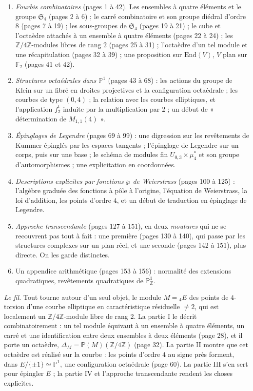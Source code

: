 \documentclass[11pt,a4paper]{article}
\begin{document}
\begin{enumerate}
\item[I.] \emph{Fourbis combinatoires} (pages 1 à 42). Les ensembles à quatre
éléments et le groupe $\mathfrak{S}_4$ (pages 2 à 6) ; le carré combinatoire et
son groupe diédral d'ordre $8$ (pages 7 à 19) ; les sous-groupes de
$\mathfrak{S}_4$ (pages 19 à 21) ; le cube et l'octaèdre attachés à un ensemble
à quatre éléments (pages 22 à 24) ; les $\mathbb{Z}/4\mathbb{Z}$-modules libres
de rang $2$ (pages 25 à 31) ; l'octaèdre d'un tel module et une récapitulation
(pages 32 à 39) ; une proposition sur $\mathrm{End}(V)$, $V$ plan sur
$\mathbb{F}_2$ (pages 41 et 42).
\item[II.] \emph{Structures octaédrales dans $\mathbb{P}^1$} (pages 43 à 68) :
les actions du groupe de Klein sur un fibré en droites projectives et la
configuration octaédrale ; les courbes de type $(0,4)$ ; la relation avec les
courbes elliptiques, et l'application $f_2^t$ induite par la multiplication
par $2$ ; un début de « détermination de $M_{1,1}(4)$ ».
\item[III.] \emph{Épinglages de Legendre} (pages 69 à 99) : une digression sur
les revêtements de Kummer épinglés par les espaces tangents ; l'épinglage de
Legendre sur un corps, puis sur une base ; le schéma de modules fin
$U_{0,3} \times \mu_4^{*}$ et son groupe d'automorphismes ; une explicitation
en coordonnées.
\item[IV.] \emph{Descriptions explicites par fonctions $\wp$ de Weierstrass}
(pages 100 à 125) : l'algèbre graduée des fonctions à pôle à l'origine,
l'équation de Weierstrass, la loi d'addition, les points d'ordre $4$, et un
début de traduction en épinglage de Legendre.
\item[V.] \emph{Approche transcendante} (pages 127 à 151), en deux
\emph{moutures} qui ne se recouvrent pas tout à fait : une première (pages
130 à 140), qui passe par les structures complexes sur un plan réel, et une
seconde (pages 142 à 151), plus directe. On les garde distinctes.
\item[VI.] Un appendice arithmétique (pages 153 à 156) : normalité des
extensions quadratiques, revêtements quadratiques de $\mathbb{P}^1_{\mathbb{Z}}$.
\end{enumerate}

\emph{Le fil.} Tout tourne autour d'un seul objet, le module $M = {}_4E$ des
points de $4$-torsion d'une courbe elliptique en caractéristique résiduelle
$\neq 2$, qui est localement un $\mathbb{Z}/4\mathbb{Z}$-module libre de rang
$2$. La partie I le décrit combinatoirement : un tel module équivaut à un
ensemble à quatre éléments, un carré et une identification entre deux
ensembles à deux éléments (page 28), et il porte un octaèdre,
$\Delta_M = \mathbb{P}(M)(\mathbb{Z}/4\mathbb{Z})$ (page 32). La partie II
montre que cet octaèdre est réalisé sur la courbe : les points d'ordre $4$ au
signe près forment, dans $E/\{\pm 1\} \simeq \mathbb{P}^1$, une configuration
octaédrale (page 60). La partie III s'en sert pour épingler $E$ ; la partie IV
et l'approche transcendante rendent les choses explicites.
\end{document}

